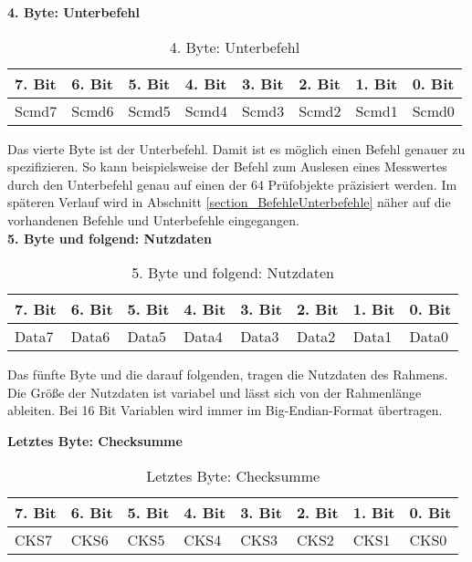 \textbf{4. Byte: Unterbefehl}

\begin{table}[H]
\begin{center}
\begin{tabularx}{\textwidth}{|X|X|X|X|X|X|X|X|}\hline
 7. Bit & 6. Bit & 5. Bit & 4. Bit & 3. Bit & 2. Bit & 1. Bit & 0. Bit\\ \hline
 Scmd7 & Scmd6 & Scmd5 & Scmd4 & Scmd3 & Scmd2 & Scmd1 & Scmd0\\ \hline
\end{tabularx}
\caption{4. Byte: Unterbefehl}
\label{table_4Byte}
\end{center}
\end{table}

Das vierte Byte ist der Unterbefehl. Damit ist es möglich einen Befehl genauer zu spezifizieren. So kann beispielsweise der Befehl zum Auslesen eines Messwertes durch den Unterbefehl genau auf einen der 64 Prüfobjekte präzisiert werden. Im späteren Verlauf wird in Abschnitt \ref{section_BefehleUnterbefehle} näher auf die vorhandenen Befehle und Unterbefehle eingegangen.\\



\textbf{5. Byte und folgend: Nutzdaten}

\begin{table}[H]
\begin{center}
\begin{tabularx}{\textwidth}{|X|X|X|X|X|X|X|X|}\hline
 7. Bit & 6. Bit & 5. Bit & 4. Bit & 3. Bit & 2. Bit & 1. Bit & 0. Bit\\ \hline
 Data7 & Data6 & Data5 & Data4 & Data3 & Data2 & Data1 & Data0\\ \hline
\end{tabularx}
\caption{5. Byte und folgend: Nutzdaten}
\label{table_5Byte}
\end{center}
\end{table}

Das fünfte Byte und die darauf folgenden, tragen die Nutzdaten des Rahmens. Die Größe der Nutzdaten ist variabel und lässt sich von der Rahmenlänge ableiten. Bei 16 Bit Variablen wird immer im Big-Endian-Format übertragen. \\


\newpage

\textbf{Letztes Byte: Checksumme}

\begin{table}[H]
\begin{center}
\begin{tabularx}{\textwidth}{|X|X|X|X|X|X|X|X|}\hline
 7. Bit & 6. Bit & 5. Bit & 4. Bit & 3. Bit & 2. Bit & 1. Bit & 0. Bit\\ \hline
 CKS7 & CKS6 & CKS5 & CKS4 & CKS3 & CKS2 & CKS1 & CKS0\\ \hline
\end{tabularx}
\caption{Letztes Byte: Checksumme}
\label{table_LastByte}
\end{center}
\end{table}

